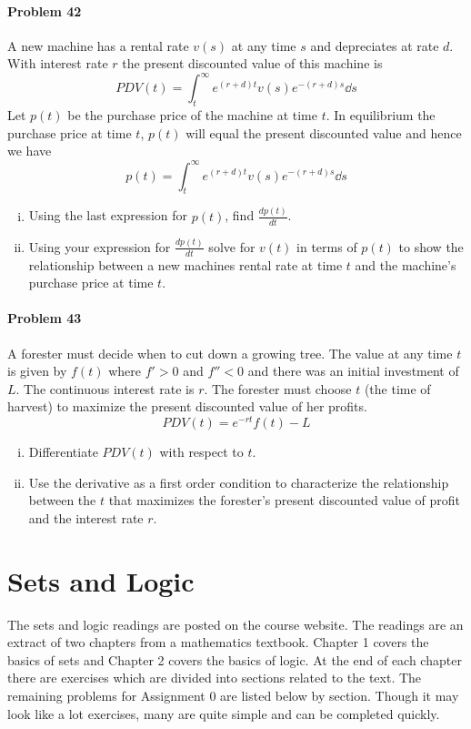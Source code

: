 \documentclass[a4paper, 11pt]{article}
\begin{document}
\paragraph{Problem 42}
A new machine has a rental rate $v(s)$ at any time $s$ and depreciates at rate $d$.
With interest rate $r$ the present discounted value of this machine is 
\[
	PDV(t) = \int_{t}^{\infty} e^{(r+d)t} v(s) e^{-(r+d)s} \dd s
\]
Let $p(t)$ be the purchase price of the machine at time $t$.
In equilibrium the purchase price at time $t$, $p(t)$ will equal the present discounted value and hence we have
\[
	p(t) = \int_{t}^{\infty} e^{(r+d)t} v(s)e^{-(r+d)s} \dd s
\]
\begin{enumerate}[(i)]
	\item Using the last expression for $p(t)$, find $\frac{dp(t)}{dt}$.
	\item Using your expression for $\frac{dp(t)}{dt}$ solve for $v(t)$ in terms of $p(t)$ to show the relationship between a new machines rental rate at time $t$ and the machine's purchase price at time $t$.
\end{enumerate}


\paragraph{Problem 43}
A forester must decide when to cut down a growing tree.
The value at any time $t$ is given by $f(t)$ where $f' > 0$ and $f'' < 0$ and there was an initial investment of $L$.
The continuous interest rate is $r$.
The forester must choose $t$ (the time of harvest) to maximize the present discounted value of her profits.
\[
	PDV(t) = e^{-rt}f(t) - L
\]
\begin{enumerate}[(i)]
	\item Differentiate $PDV(t)$ with respect to $t$.
	\item Use the derivative as a first order condition to characterize the relationship between the $t$ that maximizes the forester's present discounted value of profit and the interest rate $r$.
\end{enumerate}


\section{Sets and Logic}

The sets and logic readings are posted on the course website.
The readings are an extract of two chapters from a mathematics textbook.
Chapter 1 covers the basics of sets and Chapter 2 covers the basics of logic.
At the end of each chapter there are exercises which are divided into sections related to the text.
The remaining problems for Assignment 0 are listed below by section.
Though it may look like a lot exercises, many are quite simple and can be completed quickly.
\end{document}
